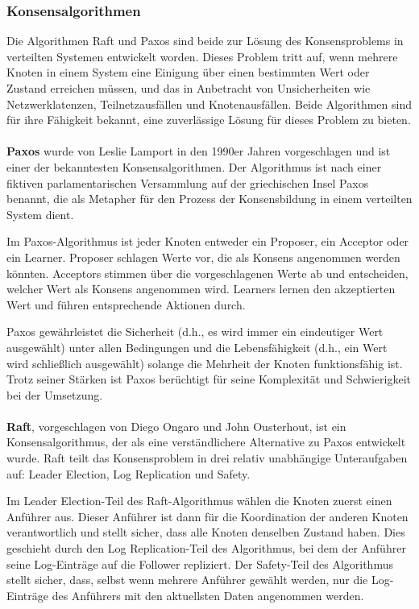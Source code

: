 \subsubsection{Konsensalgorithmen}

Die Algorithmen Raft und Paxos sind beide zur Lösung des Konsensproblems in verteilten Systemen entwickelt worden. Dieses Problem tritt auf, wenn mehrere Knoten in einem System eine Einigung über einen bestimmten Wert oder Zustand erreichen müssen, und das in Anbetracht von Unsicherheiten wie Netzwerklatenzen, Teilnetzausfällen und Knotenausfällen. Beide Algorithmen sind für ihre Fähigkeit bekannt, eine zuverlässige Lösung für dieses Problem zu bieten.
\\\\
\textbf{Paxos} wurde von Leslie Lamport in den 1990er Jahren vorgeschlagen und ist einer der bekanntesten Konsensalgorithmen. Der Algorithmus ist nach einer fiktiven parlamentarischen Versammlung auf der griechischen Insel Paxos benannt, die als Metapher für den Prozess der Konsensbildung in einem verteilten System dient.

Im Paxos-Algorithmus ist jeder Knoten entweder ein Proposer, ein Acceptor oder ein Learner. Proposer schlagen Werte vor, die als Konsens angenommen werden könnten. Acceptors stimmen über die vorgeschlagenen Werte ab und entscheiden, welcher Wert als Konsens angenommen wird. Learners lernen den akzeptierten Wert und führen entsprechende Aktionen durch.

Paxos gewährleistet die Sicherheit (d.h., es wird immer ein eindeutiger Wert ausgewählt) unter allen Bedingungen und die Lebensfähigkeit (d.h., ein Wert wird schließlich ausgewählt) solange die Mehrheit der Knoten funktionsfähig ist. Trotz seiner Stärken ist Paxos berüchtigt für seine Komplexität und Schwierigkeit bei der Umsetzung.
\\\\
\textbf{Raft}, vorgeschlagen von Diego Ongaro und John Ousterhout, ist ein Konsensalgorithmus, der als eine verständlichere Alternative zu Paxos entwickelt wurde. Raft teilt das Konsensproblem in drei relativ unabhängige Unteraufgaben auf: Leader Election, Log Replication und Safety.

Im Leader Election-Teil des Raft-Algorithmus wählen die Knoten zuerst einen Anführer aus. Dieser Anführer ist dann für die Koordination der anderen Knoten verantwortlich und stellt sicher, dass alle Knoten denselben Zustand haben. Dies geschieht durch den Log Replication-Teil des Algorithmus, bei dem der Anführer seine Log-Einträge auf die Follower repliziert. Der Safety-Teil des Algorithmus stellt sicher, dass, selbst wenn mehrere Anführer gewählt werden, nur die Log-Einträge des Anführers mit den aktuellsten Daten angenommen werden.

